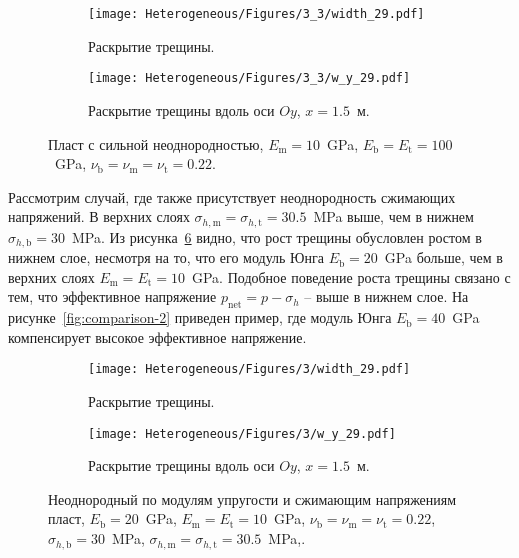 \begin{figure}[htbp]
    \centering
    \begin{subfigure}[t]{0.4\textwidth}
        \centering
        \caption{Раскрытие трещины.}
        \label{fig:heterogeneous-3layer-planar}
        \texttt{[image: Heterogeneous/Figures/3\_3/width\_29.pdf]}
    \end{subfigure}
    \hfill 
    \begin{subfigure}[t]{0.55\textwidth}
        \centering
        \caption{Раскрытие трещины вдоль оси $Oy$, $x=1.5$~м.}
        \label{fig:heterogeneous-3layer-slice}
        \texttt{[image: Heterogeneous/Figures/3\_3/w\_y\_29.pdf]}
    \end{subfigure}
    \caption{Пласт с сильной неоднородностью, $E_\text{m} = 10$~GPa, $E_\text{b} = E_\text{t} = 100$~GPa, $\nu_\text{b} = \nu_\text{m} = \nu_\text{t} = 0.22$.}
    \label{fig:heterogeneous-3layer}
\end{figure}


Рассмотрим случай, где также присутствует неоднородность сжимающих напряжений. В верхних слоях $\sigma_{h,\text{m}} = \sigma_{h,\text{t}} = 30.5$~MPa выше, чем в нижнем $\sigma_{h,\text{b}} = 30$~MPa. Из рисунка~\ref{fig:comparison-1} видно, что рост трещины обусловлен ростом в нижнем слое, несмотря на то, что его модуль Юнга $E_\text{b} = 20$~GPa больше, чем в верхних слоях $E_\text{m} = E_\text{t} = 10$~GPa. Подобное поведение роста трещины связано с тем, что эффективное напряжение $p_\text{net} = p - \sigma_h$ -- выше в нижнем слое. На рисунке~\ref{fig:comparison-2} приведен пример, где модуль Юнга $E_\text{b} = 40$~GPa компенсирует высокое эффективное напряжение.

\begin{figure}[htbp]
    \centering
    \begin{subfigure}[t]{0.4\textwidth}
        \centering
        \caption{Раскрытие трещины.}
        \label{fig:comparison-1-planar}
        \texttt{[image: Heterogeneous/Figures/3/width\_29.pdf]}
    \end{subfigure}
    \hfill 
    \begin{subfigure}[t]{0.55\textwidth}
        \centering
        \caption{Раскрытие трещины вдоль оси $Oy$, $x=1.5$~м.}
        \label{fig:comparison-1-slice}
        \texttt{[image: Heterogeneous/Figures/3/w\_y\_29.pdf]}
    \end{subfigure}
    \caption{Неоднородный по модулям упругости и сжимающим напряжениям пласт, $E_\text{b} = 20$~GPa, $E_\text{m} = E_\text{t} = 10$~GPa, $\nu_\text{b} = \nu_\text{m} = \nu_\text{t} = 0.22$, $\sigma_{h,\text{b}} = 30$~MPa, $\sigma_{h,\text{m}} = \sigma_{h,\text{t}} = 30.5$~MPa,.}
    \label{fig:comparison-1}
\end{figure}


